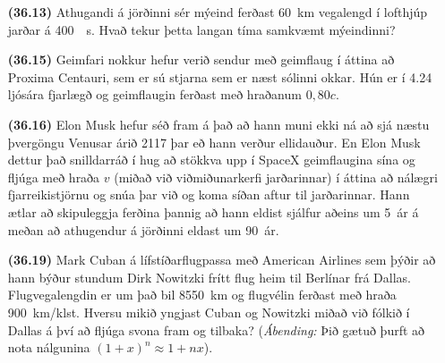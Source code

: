 \begin{enumerate}[label = \textbf{(\alph*)}]


\item[\textbf{(36.13)}] Athugandi á jörðinni sér mýeind ferðast \SI{60}{km} vegalengd í lofthjúp jarðar á \SI{400}{\mu s}. Hvað tekur þetta langan tíma samkvæmt mýeindinni?

\item[\textbf{(36.15)}] Geimfari nokkur hefur verið sendur með geimflaug í áttina að Proxima Centauri, sem er sú stjarna sem er næst sólinni okkar. Hún er í \SI{4.24}{} ljósára fjarlægð og geimflaugin ferðast með hraðanum $0,80c$.

\item[\textbf{(36.16)}] Elon Musk hefur séð fram á það að hann muni ekki ná að sjá næstu þvergöngu Venusar árið 2117 þar eð hann verður ellidauður. En Elon Musk dettur það snilldarráð í hug að stökkva upp í SpaceX geimflaugina sína og fljúga með hraða $v$ (miðað við viðmiðunarkerfi jarðarinnar) í áttina að nálægri fjarreikistjörnu og snúa þar við og koma síðan aftur til jarðarinnar. Hann ætlar að skipuleggja ferðina þannig að hann eldist sjálfur aðeins um \SI{5}{ár} á meðan að athugendur á jörðinni eldast um \SI{90}{ár}. 

\item[\textbf{(36.19)}] Mark Cuban á lífstíðarflugpassa með American Airlines sem þýðir að hann býður stundum Dirk Nowitzki frítt flug heim til Berlínar frá Dallas. Flugvegalengdin er um það bil \SI{8550}{km} og flugvélin ferðast með hraða \SI{900}{km/klst}. Hversu mikið yngjast Cuban og Nowitzki miðað við fólkið í Dallas á því að fljúga svona fram og tilbaka? (\textit{Ábending:} Þið gætuð þurft að nota nálgunina $(1+x)^n \approx 1+ nx$).

\end{enumerate}

